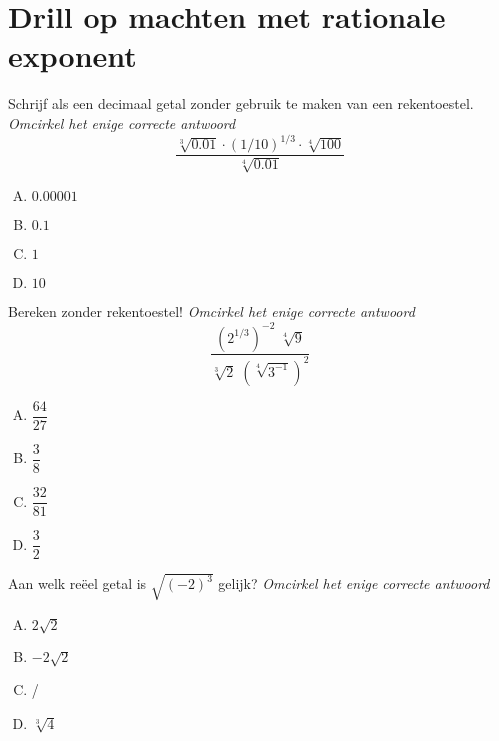 \documentclass[12pt]{article}
\begin{document}
\section*{Drill op machten met rationale exponent}

\begin{oefening}
Schrijf als een decimaal getal zonder gebruik te maken van een rekentoestel. {\em\small Omcirkel het enige correcte antwoord}
$$\dfrac{\sqrt[3]{0.01}\cdot\left(1/10\right)^{1/3}\cdot\sqrt[4]{100}}{\sqrt[4]{0.01}}$$
\begin{multicols}{4}
\begin{enumerate}[(A)]
  \item $0.00001$
  \item $0.1$
  \item $1$
  \item $10$
\end{enumerate}
\end{multicols}
\end{oefening}
\vfil

\begin{oefening}
Bereken zonder rekentoestel! {\em\small Omcirkel het enige correcte antwoord}
$$\dfrac{(2^{1/3})^{-2}\;\sqrt[4]{9}}{\sqrt[3]{2}\;(\sqrt[4]{3^{-1}})^{2}}$$
\begin{multicols}{4}
\begin{enumerate}[(A)]
  \item $\dfrac{64}{27}$
  \item $\dfrac{3}{8}$
  \item $\dfrac{32}{81}$
  \item $\dfrac{3}{2}$
\end{enumerate}
\end{multicols}
\end{oefening}
\vfil

\begin{oefening}
Aan welk reëel getal is $\sqrt{(-2)^3}$ gelijk? {\em\small Omcirkel het enige correcte antwoord}
\begin{multicols}{4}
\begin{enumerate}[(A)]
  \item $2\sqrt{2}$
  \item $-2\sqrt{2}$
  \item /
  \item $\sqrt[3]{4}$
\end{enumerate}
\end{multicols}
\end{oefening}
\vfil
\end{document}
